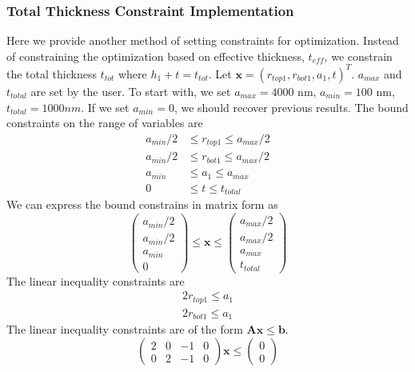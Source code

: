 \documentclass[12pt]{article}
\numberwithin{equation}{section}
\numberwithin{equation}{section}
\begin{document}
\subsubsection{Total Thickness Constraint Implementation}
Here we provide another method of setting constraints for optimization.
Instead of constraining the optimization based on effective thickness, $t_{eff}$, we constrain the total thickness $t_{tot}$ where $h_1 + t = t_{tot}$.  
Let $\mathbf{x} = \left ( r_{top1}, r_{bot1}, a_1, t  \right )^T $.
$a_{max}$ and $t_{total}$ are set by the user.  To start with, we set $a_{max} = 4000$ nm, $a_{min} = 100$ nm, $t_{total} = 1000 nm$.  If we set $a_{min} = 0$, we should recover previous results.
The bound constraints on the range of variables are
\begin{align*}
a_{min}/2 & \leq r_{top1} \leq a_{max}/2 \\
a_{min}/2 & \leq r_{bot1} \leq a_{max}/2 \\
a_{min} & \leq a_{1} \leq a_{max} \\
0 & \leq t \leq t_{total}
\end{align*}
We can express the bound constrains in matrix form as
\begin{equation}
\left(
\begin{matrix}
a_{min}/2\\ 
a_{min}/2\\
a_{min}\\ 
0 
\end{matrix} \right )
\leq \mathbf{x}
 \leq 
 \left(
\begin{matrix}
a_{max}/2 \\ a_{max}/2 \\ a_{max} \\  t_{total}
\end{matrix} \right )
\end{equation}
The linear inequality constraints are 
\begin{align*}   
2r_{top1} \leq a_1 \\
2r_{bot1} \leq a_1 
\end{align*}
The linear inequality constraints are of the form $\mathbf{A} \mathbf{x} \leq \mathbf{b}$.
\begin{equation}
\left(
\begin{matrix}
2 & 0 & -1 & 0  \\
0 & 2 & -1 & 0 
\end{matrix}
\right ) \mathbf{x}  \leq \left ( \begin{matrix} 0\\ 0 \end{matrix} \right ) 
\end{equation}
\end{document}
